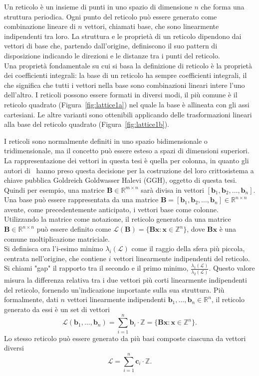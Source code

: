 Un reticolo è un insieme di punti in uno spazio di dimensione $n$ che forma una struttura 
periodica. Ogni punto del reticolo può essere generato come combinazione lineare di 
$n$ vettori, chiamati base, che sono linearmente indipendenti tra loro.
La struttura e le proprietà di un reticolo dipendono dai vettori di base che, 
partendo dall'origine, definiscono il suo pattern di disposizione indicando le direzioni 
e le distanze tra i punti del reticolo. \\
Una proprietà fondamentale su cui si basa la definizione di reticolo è la proprietà dei 
coefficienti integrali: la base di un reticolo ha sempre coefficienti integrali, 
il che significa che tutti i vettori nella base sono combinazioni lineari intere 
l'uno dell'altro.
I reticoli possono essere formati in diversi modi, il più comune è il reticolo quadrato 
(Figura~\ref{fig:lattice1a}) nel quale la base è allineata con gli assi cartesiani. 
Le altre varianti sono ottenibili applicando delle trasformazioni lineari alla base del 
reticolo quadrato (Figura~\ref{fig:lattice1b}).


I reticoli sono normalmente definiti in uno spazio bidimensionale o tridimensionale, 
ma il concetto può essere esteso a spazi di dimensioni superiori. La rappresentazione dei vettori in questa tesi è quella per colonna, 
in quanto gli autori di~\cite{GGH97} hanno preso questa decisione per la costruzione
del loro crittosistema a chiave pubblica Goldreich Goldwasser Halevi (GGH), oggetto di questa tesi. Quindi per esempio, una matrice 
$\mathbf{B} \in \mathbb{R}^{m\times n}$ sarà divisa in vettori 
$[\mathbf{b}_1, \mathbf{b}_2, \dots, \mathbf{b}_n]$. 
\\
Una base può essere rappresentata da una matrice  
$\mathbf{B} = [\mathbf{b}_1,\mathbf{b}_2,\dots,\mathbf{b}_n] \in \mathbb{R}^{n \times n}$ 
avente, come precedentemente anticipato, i vettori base come colonne.  Utilizzando la matrice come notazione, 
il reticolo generato da una matrice 
$\mathbf{B} \in \mathbb{R}^{n \times n}$ 
può essere definito come 
${\mathcal{L}(\mathbf{B}) = \bigl\{ \mathbf{B} \mathbf{x} : \mathbf{x} \in \mathbb{Z}^n \bigr\}}$, 
dove $\mathbf{B} \mathbf{x}$ 
è una comune moltiplicazione matriciale. \\
Si definisca ora l'i-esimo minimo $\lambda_i(\mathcal{L})$ come il raggio della sfera più 
piccola, centrata nell'origine, che contiene $i$ vettori linearmente indipendenti del reticolo. 
Si chiami "gap" il rapporto tra il secondo e il primo minimo, 
$\frac{\lambda_1(\mathcal{L})}{\lambda_2(\mathcal{L})}$. 
Questo valore misura la differenza relativa tra i due vettori più corti linearmente 
indipendenti del reticolo, fornendo un'indicazione importante sulla sua struttura.
Più formalmente, dati $n$ vettori linearmente indipendenti 
$\mathbf{b}_1,\dots, \mathbf{b}_n \in \mathbb{R}^n$,
il reticolo generato da essi è un set di vettori 
\[
\mathcal{L} (\mathbf{b}_1,\dots,\mathbf{b}_n) = \sum_{i=1}^{n}\mathbf{b}_i \cdot 
\mathbb{Z} = \bigl\{ {\mathbf{B} \mathbf{x} : \mathbf{x} \in \mathbb{Z}^n} \bigr\}.
\]
Lo stesso reticolo può essere generato da più basi composte ciascuna da vettori diversi
\[
    \mathcal{L} = \sum_{i=1}^{n}\mathbf{c}_i \cdot \mathbb{Z} .
\]

